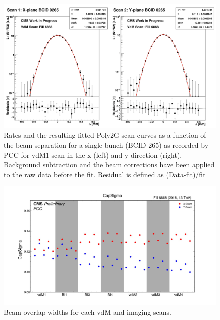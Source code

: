\begin{figure}[!htp]
    \centering
    \includegraphics[width=1\textwidth]{ashish_thesis/vdM_fit_cveto_1.png}
    \caption[PCC rate fit]{Rates and the resulting fitted Poly2G scan curves as a function of the beam separation for a single bunch (BCID 265) as recorded by PCC for vdM1 scan in the x (left) and y direction (right). Background subtraction and the beam corrections have been applied to the raw data before the fit. Residual is defined as (Data-fit)/fit}
    \label{fig:fitquality}
\end{figure}


\begin{figure}[H]
    \centering
    \includegraphics[width=1\textwidth]{ashish_thesis/Poly2G_CapSigma.jpeg}
    \caption[Beam overlap widths]{Beam overlap widths for each vdM and imaging scans.}
    \label{fig:fitquality_4040}
\end{figure}



